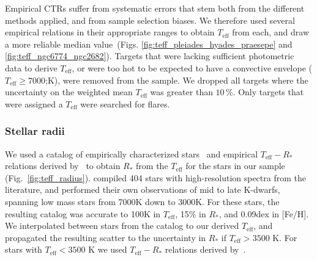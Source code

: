 \documentclass{aa}
\begin{document}
Empirical CTRs suffer from systematic errors that stem both from the different methods applied, and from sample selection biases. We therefore used several empirical relations in their appropriate ranges to obtain $T_\mathrm{eff}$ from each, and draw a more reliable median value~(Figs. \ref{fig:teff_pleiades_hyades_praesepe} and \ref{fig:teff_ngc6774_ngc2682}). Targets that were lacking sufficient photometric data to derive $T_\mathrm{eff}$, or were too hot to be expected to have a convective envelope ($T_\mathrm{eff} \geq 7000$;K), were removed from the sample. We dropped all targets where the uncertainty on the weighted mean $T_\mathrm{eff}$ was greater than $10\,$\%. Only targets that were assigned a $T_\mathrm{eff}$ were searched for flares. 
\subsubsection{Stellar radii}
We used a catalog of empirically characterized stars~\citep{yee_specmatch_2017} and empirical $T_\mathrm{eff}-R_*$ relations derived by~\citet{mann_how_2015,mann_erratum_2016} to obtain $R_*$ from the $T_\mathrm{eff}$ for the stars in our sample (Fig.~\ref{fig:teff_radius}). \citet{yee_specmatch_2017} compiled 404 stars with high-resolution spectra from the literature, and performed their own observations of mid to late K-dwarfs, spanning low mass stars from 7000\;K down to 3000\;K. For these stars, the resulting catalog was accurate to 100\;K in
$T_\mathrm{eff}$, 15\;\% in $R_*$, and 0.09\;dex in [Fe/H]. We interpolated between stars from the catalog to our derived $T_\mathrm{eff}$,  and propagated the resulting scatter to the uncertainty in $R_*$ if $T_\mathrm{eff}>3500$ K. For stars with $T_\mathrm{eff}< 3500$ K we used $T_\mathrm{eff}-R_*$ relations derived by~\citet{mann_how_2015,mann_erratum_2016}. 
\end{document}
